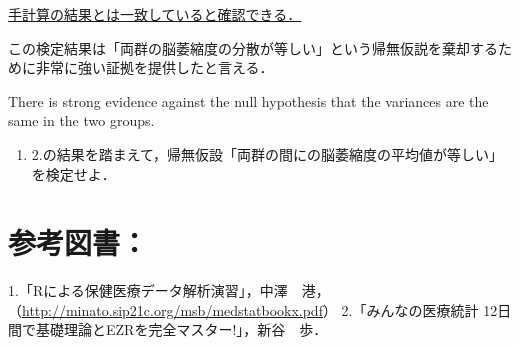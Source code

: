 \documentclass[11pt,]{problemset}
\providecommand{\tightlist}{%
  \setlength{\itemsep}{0pt}\setlength{\parskip}{0pt}}
\begin{document}
\underline{手計算の結果とは一致していると確認できる．}

この検定結果は「両群の脳萎縮度の分散が等しい」という帰無仮説を棄却するために非常に強い証拠を提供したと言える．

There is strong evidence against the null hypothesis that the variances
are the same in the two groups.

\newpage
\vfill

\begin{enumerate}
\def\labelenumi{\arabic{enumi}.}
\setcounter{enumi}{2}
\tightlist
\item
  2.の結果を踏まえて，帰無仮設「両群の間にの脳萎縮度の平均値が等しい」を検定せよ．
\end{enumerate}

\newpage
\vfill

\section{参考図書：}

1.「Rによる保健医療データ解析演習」，中澤　港，（\url{http://minato.sip21c.org/msb/medstatbookx.pdf}）
2.「みんなの医療統計 12日間で基礎理論とEZRを完全マスター!」，新谷　歩．
\end{document}
